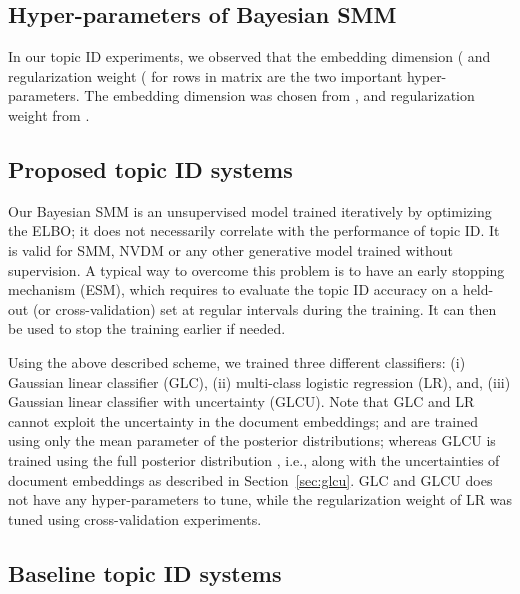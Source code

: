 \documentclass[journal]{IEEEtran}
\begin{document}
\subsection{Hyper-parameters of Bayesian SMM}
\label{ssec:hyper}
In our topic ID experiments, we observed that the embedding dimension (
and regularization weight ( for rows in matrix  are the 
two important hyper-parameters. The embedding dimension was chosen from 
, and regularization weight from . 




\subsection{Proposed topic ID systems}
\label{ssec:proposed_sys}
Our Bayesian SMM is an unsupervised model trained iteratively by 
optimizing the ELBO; it does not necessarily correlate
with the performance of topic ID. It is valid for SMM, NVDM or any other 
generative model trained without supervision. A typical way to overcome this 
problem is to have an early stopping mechanism (ESM), which requires to 
evaluate the topic ID accuracy on a held-out (or cross-validation) set at 
regular intervals during the training. It can then be used to stop the 
training earlier if needed.

Using the above described scheme, we trained three different classifiers:
(i) Gaussian linear classifier (GLC), (ii) multi-class logistic 
regression (LR), and, (iii) Gaussian linear classifier with uncertainty 
(GLCU). Note that GLC and LR cannot exploit the uncertainty in the document 
embeddings; and are trained using only the mean parameter  of the 
posterior distributions; whereas GLCU is trained using the full posterior 
distribution , i.e., along with the uncertainties of document 
embeddings as described in Section~\ref{sec:glcu}. GLC and GLCU does not have 
any hyper-parameters to tune, while the  regularization weight of LR 
was tuned using cross-validation experiments.

\subsection{Baseline topic ID systems}
\label{ssec:baselines}
\end{document}
